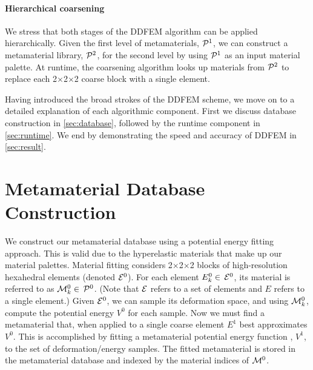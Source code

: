 \paragraph{Hierarchical coarsening}
We stress that both stages of the DDFEM algorithm can be applied hierarchically. Given the first level of metamaterials, $\mathcal{P}^1$, we can construct a metamaterial library, $\mathcal{P}^2$, for the second level by using $\mathcal{P}^1$ as an input material palette. At runtime, the coarsening algorithm looks up materials from $\mathcal{P}^2$ to replace each 2$\times$2$\times$2 coarse block with a single element.

Having introduced the broad strokes of the DDFEM scheme, we move on to a detailed explanation of each algorithmic component. First we discuss database construction in \autoref{sec:database}, followed by the runtime component in \autoref{sec:runtime}. We end by demonstrating the speed and accuracy of DDFEM in \autoref{sec:result}.

\section{Metamaterial Database Construction}
\label{sec:database}
We construct our metamaterial database using a potential energy fitting approach. This is valid due to the hyperelastic materials that make up our material palettes. Material fitting considers 2$\times$2$\times$2 blocks of high-resolution hexahedral elements (denoted $\mathcal{E}^0$). For each element $E_k^0\in \, \mathcal{E}^0$, its material is referred to as $\mathcal{M}_k^0\in \, \mathcal{P}^0$. (Note that $\mathcal{E}$ refers to a set of elements and $E$ refers to a single element.) Given $\mathcal{E}^0$, we can sample its deformation space, and using $\mathcal{M}_k^0$, compute the potential energy $V^0$ for each sample.  Now we must find a metamaterial that, when applied to a single coarse element $\mathit{E}^1$ best approximates $V^0$.  This is accomplished by fitting a metamaterial potential energy function , $V^1$, to the set of deformation/energy samples. The fitted metamaterial is stored in the metamaterial database and indexed by the material indices of $\mathcal{M}^0$.

